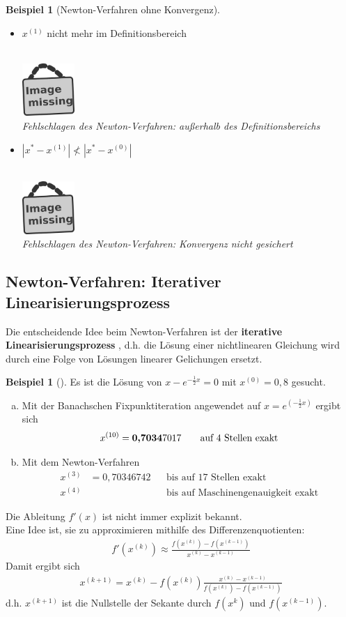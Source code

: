 \documentclass[ngerman,fontsize=11pt, paper=a4, parskip=half, titlepage=true, toc=bib]{scrbook}
\theoremstyle{definition}
\newtheorem{Bsp}[Def]{Beispiel}
\theoremstyle{plain}
\newcommand{\subsectione}[1]{\addtocounter{Def}{1}\subsection{#1}}
\newenvironment{Bspe}[1][]{ %
	\begin{Bsp}[#1]
	}
	{
	\end{Bsp}
	\addtocounter{subsection}{1}
}
\newcommand{\imagemissing}[1]{
  \begin{center}~\\
    \centering 
    \includegraphics[width=2cm]{images/image_missing.jpg}\\
    \textit{#1} \\
  \end{center}
}
\begin{document}
  


  \begin{Bspe}[Newton-Verfahren ohne Konvergenz]~
  	\begin{itemize}
  		\item $x^{(1)}$ nicht mehr im Definitionsbereich
  		\imagemissing{Fehlschlagen des Newton-Verfahren: außerhalb des Definitionsbereichs}
  		\item $|x^{*}-x^{(1)}| \nless |x^{*}-x^{(0)}| $
  		\imagemissing{Fehlschlagen des Newton-Verfahren: Konvergenz nicht gesichert}
  	\end{itemize}
  \end{Bspe}
  
  \subsectione{Newton-Verfahren: Iterativer Linearisierungsprozess}
  Die entscheidende Idee beim Newton-Verfahren ist der \textbf{iterative Linearisierungsprozess}
  , d.h. die Lösung einer nichtlinearen Gleichung wird
  durch eine Folge von Lösungen linearer Gelichungen ersetzt.
  
  \begin{Bspe}
  	\label{5.4.6}
  	Es ist die Lösung von $x-e^{-\frac{1}{2}x}=0$ mit $x^{(0)}=0,8$ gesucht.
  	\begin{enumerate}[a)]
  		\item Mit der Banachschen Fixpunktiteration angewendet auf 
  		$x=e^{(-\frac{1}{2}x)}$ ergibt sich
  		\begin{gather*}
  		x^{(10)}=\text{\bfseries 0,7034}7017 
  		\qquad \text{auf 4 Stellen exakt}
  		\end{gather*}
  		\item Mit dem Newton-Verfahren
  		\begin{align*}
  		x^{(3)}&= 0,70346742 &&\text{bis auf 17 Stellen exakt}\\
  		x^{(4)} &&& \text{bis auf Maschinengenauigkeit exakt}
  		\end{align*}		
  	\end{enumerate}
  \end{Bspe}
  Die Ableitung $f'(x)$ ist nicht immer explizit bekannt. \\
  Eine Idee ist, sie zu approximieren mithilfe des Differenzenquotienten:
  \begin{gather*}
    f'(x^{(k)})  \approx \frac{f(x^{(k)})-f(x^{(k-1)})}{x^{(k)}-x^{(k-1)}}
  \end{gather*}
  Damit ergibt sich
  \begin{gather*}
    x^{(k+1)} = x^{(k)}-f(x^{(k)}) \frac{x^{(k)} - x^{(k-1)}}{f(x^{(k)})-f(x^{(k-1)})}
  \end{gather*}
  d.h. $x^{(k+1)} $ ist die Nullstelle der Sekante durch $f(x^{k})$ und $f(x^{(k-1)})$.
  
\end{document}
